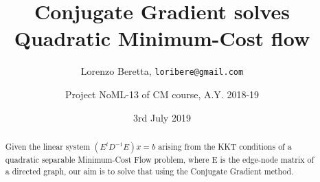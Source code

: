 \documentclass[12pt]{article}
\title{Conjugate Gradient solves Quadratic Minimum-Cost flow}
\author{Lorenzo Beretta, \texttt{loribere@gmail.com}
  \and Project NoML-13 of CM course, A.Y. 2018-19}
\date{3rd July 2019}
\begin{document}
\maketitle

\begin{abstract}
  Given the linear system $ \left(E^t D^{-1} E\right) x = b $ arising from the KKT conditions of a quadratic separable Minimum-Cost Flow problem, where E is the edge-node matrix of a directed graph, our aim is to solve that using the Conjugate Gradient method.
\end{abstract}


\begin{Introduction}
  \cite{trefethen97}
\end{Introduction}
  
  
  

\end{document}
